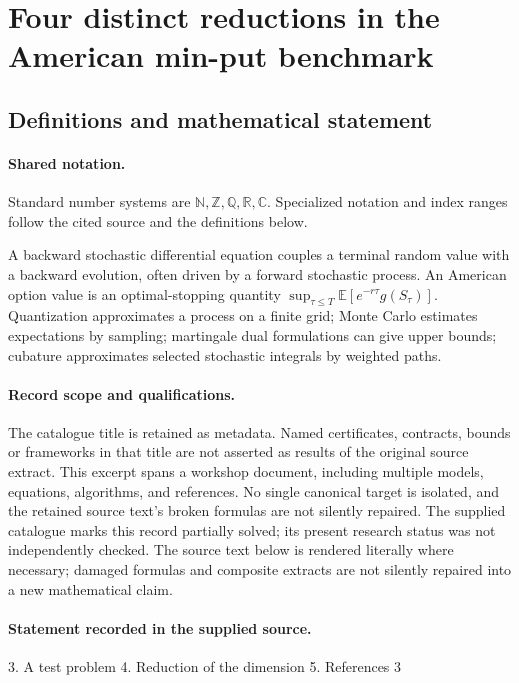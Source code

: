 \documentclass[11pt]{article}
\begin{document}
\section{Four distinct reductions in the American min-put benchmark}\label{statement}

\subsection{Definitions and mathematical statement}

\paragraph{Shared notation.}Standard number systems are $\mathbb N,\mathbb Z,\mathbb Q,\mathbb R,\mathbb C$. Specialized notation and index ranges follow the cited source and the definitions below.


A backward stochastic differential equation couples a terminal random value with a backward evolution, often driven by a forward stochastic process. An American option value is an optimal-stopping quantity $\sup_{\tau\leq T}\mathbb E[e^{-r\tau}g(S_\tau)]$. Quantization approximates a process on a finite grid; Monte Carlo estimates expectations by sampling; martingale dual formulations can give upper bounds; cubature approximates selected stochastic integrals by weighted paths.
\paragraph{Record scope and qualifications.}
The catalogue title is retained as metadata. Named certificates, contracts, bounds or frameworks in that title are not asserted as results of the original source extract.
This excerpt spans a workshop document, including multiple models, equations, algorithms, and references. No single canonical target is isolated, and the retained source text's broken formulas are not silently repaired. The supplied catalogue marks this record partially solved; its present research status was not independently checked.
The source text below is rendered literally where necessary; damaged formulas and composite extracts are not silently repaired into a new mathematical claim.
\paragraph{Statement recorded in the supplied source.}
3. A test problem 4. Reduction of the dimension 5. References 3
\end{document}
